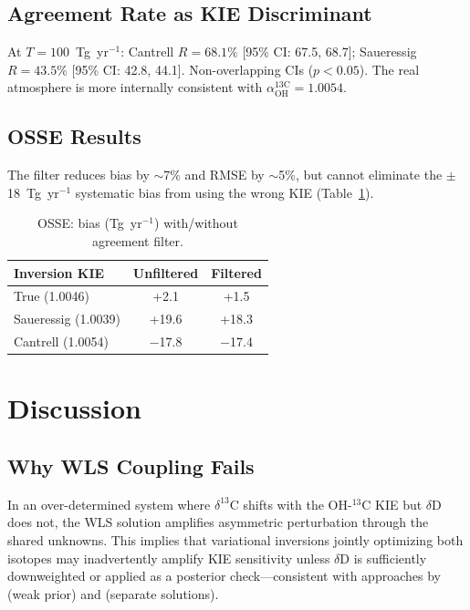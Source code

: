 \documentclass[11pt,twocolumn]{article}
\begin{document}
\subsection{Agreement Rate as KIE Discriminant}

At $T = 100$~Tg~yr$^{-1}$: Cantrell $R = 68.1\%$ [95\% CI: 67.5, 68.7]; Saueressig $R = 43.5\%$ [95\% CI: 42.8, 44.1]. Non-overlapping CIs ($p < 0.05$). The real atmosphere is more internally consistent with $\alpha_{\mathrm{OH}}^{13\mathrm{C}} = 1.0054$.

\subsection{OSSE Results}

The filter reduces bias by $\sim$7\% and RMSE by $\sim$5\%, but cannot eliminate the $\pm$18~Tg~yr$^{-1}$ systematic bias from using the wrong KIE (Table~\ref{tab:osse}).

\begin{table}[h]
\caption{OSSE: bias (Tg~yr$^{-1}$) with/without agreement filter.}
\label{tab:osse}
\centering
\begin{tabular}{lcc}
\toprule
Inversion KIE & Unfiltered & Filtered \\
\midrule
True (1.0046) & +2.1 & +1.5 \\
Saueressig (1.0039) & +19.6 & +18.3 \\
Cantrell (1.0054) & $-$17.8 & $-$17.4 \\
\bottomrule
\end{tabular}
\end{table}

\section{Discussion}

\subsection{Why WLS Coupling Fails}

In an over-determined system where $\delta^{13}$C shifts with the OH-$^{13}$C KIE but $\delta$D does not, the WLS solution amplifies asymmetric perturbation through the shared unknowns. This implies that variational inversions jointly optimizing both isotopes may inadvertently amplify KIE sensitivity unless $\delta$D is sufficiently downweighted or applied as a posterior check---consistent with approaches by \citet{Thanwerdas2024} (weak prior) and \citet{RiddellYoung2025} (separate solutions).
\end{document}
